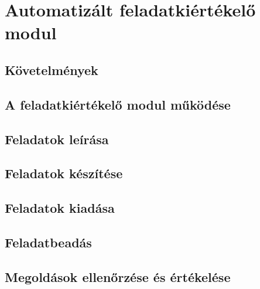 \chapter{Automatizált feladatkiértékelő modul}\label{chapter:exercise}

\section{Követelmények}

\section{A feladatkiértékelő modul működése}

\section{Feladatok leírása}

\section{Feladatok készítése}

\section{Feladatok kiadása}

\section{Feladatbeadás}

\section{Megoldások ellenőrzése és értékelése}


